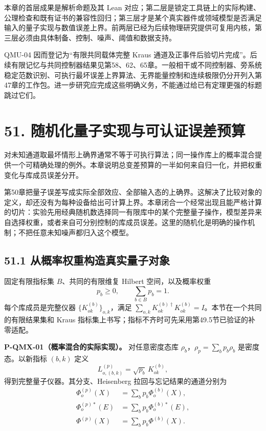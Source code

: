 \documentclass[
  11pt,
  oneside]{book}
\begin{document}
本章的首层成果是解析命题及其 Lean
对应；第二层是锁定工具链上的实际构建、公理检查和既有证书的兼容性回归；第三层才是某个真实器件或领域模型是否满足输入的量子实现与数值误差上界。前两层已经为后续物理研究提供可复用内核，第三层必须由具体制备、控制、噪声、阈值和数据支持。

QMU-04 因而登记为``有限共同载体完整 Kraus
通道及正事件后验切片完成''。后续有限记忆与共同控制器结果见第58、62、65章。一般相干或不同控制器、旁系统稳定范数识别、可执行最坏误差上界算法、无界能量控制和连续极限仍分开列入第47章的工作包。进一步研究应完成这些明确义务，不能通过给已有定理更强的标题跳过它们。

\chapter{51. 随机化量子实现与可认证误差预算}\label{ch-51}\hypertarget{ch-51}{}

对未知通道取最坏情形上确界通常不等于可执行算法；同一操作库上的概率混合提供一个可精确处理的例外。本章说明总变差预算的一半如何来自归一化，并把权重变化与库成员误差分开。

第50章把量子误差写成实际全部效应、全部输入态的上确界。这解决了比较对象的定义，却还没有为每种设备给出可计算上界。本章闭合一个经常出现且能严格计算的切片：实验先用经典随机数选择同一有限库中的某个完整量子操作，模型差异来自选择权重，或者来自可分别控制的库成员误差。这里的随机化是明确的操作机制；不把任意未知噪声都归入这个模型。

\section{51.1 从概率权重构造真实量子对象}

固定有限指标集 \(B\)、共同的有限维复 Hilbert 空间，以及概率权重 \[
p_b\ge0,\qquad \sum_{b\in B}p_b=1.
\] 每个库成员是完整仪器 \(\{K^{(b)}_{ok}\}_{o,k}\)，满足
\(\sum_{o,k}K^{(b)\dagger}_{ok}K^{(b)}_{ok}=I\)。本节在一个共同的有限结果集和
Kraus 指标集上书写；指标不齐时可先采用第49.5节已验证的补零适配。

\protect\hypertarget{p-qmx-01}{}{}

\textbf{P-QMX-01（概率混合的实际实现）。} 对任意密度态库
\(\rho_b\)，\(\rho_p=\sum_b p_b\rho_b\) 是密度态。以新指标 \((b,k)\)
定义 \[
L^{(p)}_{o,(b,k)}=\sqrt{p_b}\,K^{(b)}_{ok},
\] 得到完整量子仪器。其分支、Heisenberg 拉回与忘记结果的通道分别为 \[
\begin{aligned}
\Phi^{(p)}_o(X)&=\sum_b p_b\Phi^{(b)}_o(X),\\
\Phi^{(p)*}_o(E)&=\sum_b p_b\Phi^{(b)*}_o(E),\\
\Phi^{(p)}(X)&=\sum_b p_b\Phi^{(b)}(X).
\end{aligned}
\]
\end{document}
